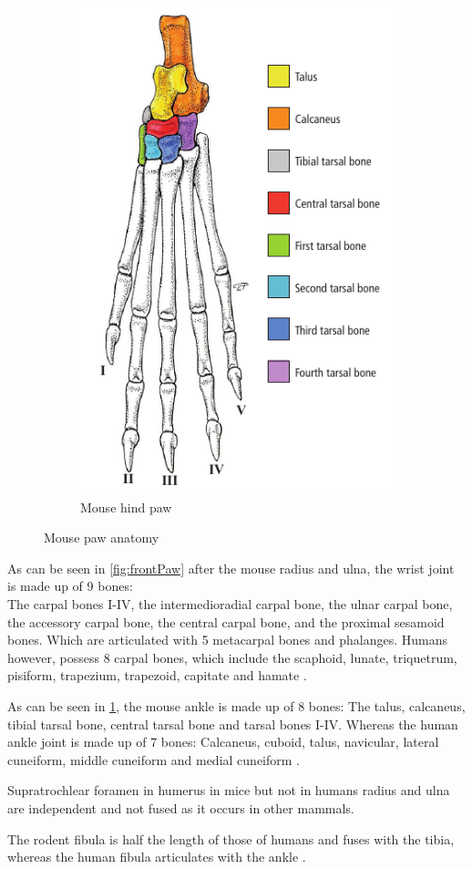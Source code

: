 \begin{figure}[h]
\begin{subfigure}{0.49\textwidth}
		\includegraphics[scale=0.5]{images/mouseHindPaw.png}
		\caption{Mouse hind paw \cite{ruberteMorphologicalMousePhenotyping2017}}\label{fig:hindPaw}
	\end{subfigure}
	\caption{Mouse paw anatomy}\label{fig:mousePaws}
\end{figure}

\noindent
As can be seen in \cref{fig:frontPaw} after the mouse radius and ulna, the wrist joint is made up of 9 bones:\\
The carpal bones I-IV, the intermedioradial carpal bone, the ulnar carpal bone, the accessory carpal bone,
the central carpal bone, and the proximal sesamoid bones.
Which are articulated with 5 metacarpal bones and phalanges.
Humans however, possess 8 carpal bones, which include the scaphoid, lunate, triquetrum, pisiform,
trapezium, trapezoid, capitate and hamate \cite{platzerTaschenatlasAnatomieBd2013}.

\noindent
As can be seen in \cref{fig:hindPaw}, the mouse ankle is made up of 8 bones:
The talus, calcaneus, tibial tarsal bone, central tarsal bone and tarsal bones I-IV.
Whereas the human ankle joint is made up of 7 bones:
Calcaneus, cuboid, talus, navicular, lateral cuneiform, middle cuneiform and medial cuneiform \cite{platzerTaschenatlasAnatomieBd2013}.

\noindent
Supratrochlear foramen in humerus in mice but not in humans \cite{ruberteMorphologicalMousePhenotyping2017,platzerTaschenatlasAnatomieBd2013}
radius and ulna are independent and not fused as it occurs in other mammals.

\noindent
The rodent fibula is half the length of those of humans and fuses with the tibia,
whereas the human fibula articulates with the ankle \cite{jeromeSkeletalSystem2018,platzerTaschenatlasAnatomieBd2013}.

